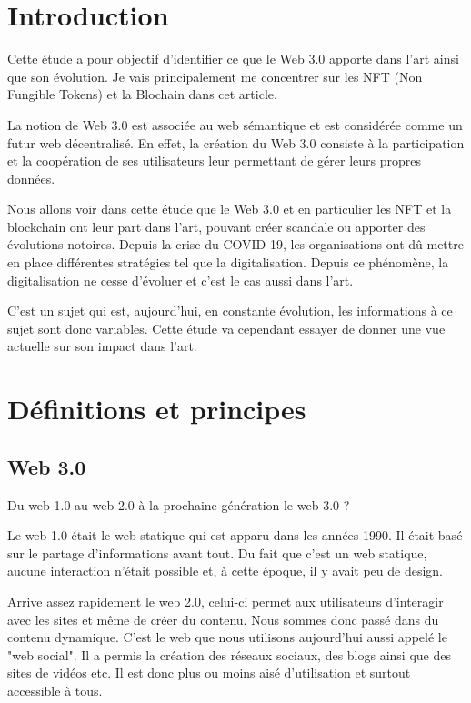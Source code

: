 \documentclass[11pt]{article}
\begin{document}
\break
\tableofcontents
\break



\section{Introduction} %
Cette étude a pour objectif d'identifier ce que le Web 3.0 apporte dans l'art ainsi que son évolution. Je vais principalement me concentrer sur les NFT (Non Fungible Tokens) et la Blochain dans cet article.

La notion de Web 3.0 est associée au web sémantique et est considérée comme un futur web décentralisé. En effet, la création du Web 3.0 consiste à la participation et la coopération de ses utilisateurs leur permettant de gérer leurs propres données. 

Nous allons voir dans cette étude que le Web 3.0 et en particulier les NFT et la blockchain ont leur part dans l'art, pouvant créer scandale ou apporter des évolutions notoires. Depuis la crise du COVID 19, les organisations ont dû mettre en place différentes stratégies tel que la digitalisation. Depuis ce phénomène, la digitalisation ne cesse d'évoluer et c'est le cas aussi dans l'art.

C'est un sujet qui est, aujourd'hui, en constante évolution, les informations à ce sujet sont donc variables. Cette étude va cependant essayer de donner une vue actuelle sur son impact dans l'art. 
\section{Définitions et principes} %
\subsection{Web 3.0} %
Du web 1.0 au web 2.0 à la prochaine génération le web 3.0 ?

Le web 1.0 était le web statique qui est apparu dans les années 1990. Il était basé sur le partage d'informations avant tout. Du fait que c'est un web statique, aucune interaction n'était possible et, à cette époque, il y avait peu de design. 

Arrive assez rapidement le web 2.0, celui-ci permet aux utilisateurs d'interagir avec les sites et même de créer du contenu. Nous sommes donc passé dans du contenu dynamique. C'est le web que nous utilisons aujourd'hui aussi appelé le "web social". Il a permis la création des réseaux sociaux, des blogs ainsi que des sites de vidéos etc. Il est donc plus ou moins aisé d'utilisation et surtout accessible à tous. \cite{barassi_does_2012}
\end{document}
